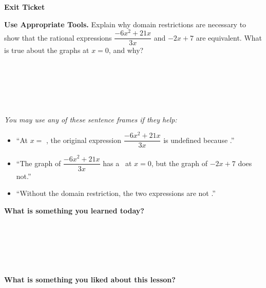 \documentclass[11pt]{article}
\newcommand{\frameblank}{\underline{\hspace{4em}}}
\newcommand{\writeline}{\rule[-2pt]{0pt}{12pt}}
\begin{document}
\vspace{0.8em}
\textbf{Exit Ticket}

\vspace{0.5em}
\textbf{Use Appropriate Tools.}\; Explain why domain restrictions are necessary to show that the rational expressions $\dfrac{-6x^{2}+21x}{3x}$ and $-2x+7$ are equivalent. What is true about the graphs at $x = 0$, and why? \\
\writeline \\[8pt]
\writeline \\[8pt]
\writeline \\[8pt]
\writeline

\vspace{0.4em}
{\small\itshape You may use any of these sentence frames if they help:}
\begin{itemize}[leftmargin=2em, itemsep=2pt, topsep=2pt]
  \item ``At $x = $ \frameblank, the original expression $\dfrac{-6x^{2}+21x}{3x}$ is undefined because \frameblank.''
  \item ``The graph of $\dfrac{-6x^{2}+21x}{3x}$ has a \frameblank\ at $x = 0$, but the graph of $-2x+7$ does not.''
  \item ``Without the domain restriction, the two expressions are not \frameblank.''
\end{itemize}

\vspace{1em}
\textbf{What is something you learned today?} \\
\writeline \\[8pt]
\writeline \\[8pt]
\writeline \\[8pt]
\writeline

\vspace{0.5em}
\textbf{What is something you liked about this lesson?} \\
\writeline \\[8pt]
\writeline \\[8pt]
\writeline \\[8pt]
\writeline
\end{document}
